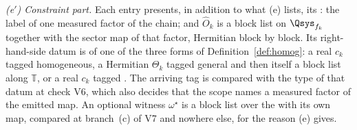 \begin{definition}
\emph{(e$'$) Constraint part.} Each entry presents, in addition to what (e)
lists, its : the label of one measured factor of the chain; and
$\hat O_k$ is a block list on $\Qsys_{f_k}$ together with the sector map of
that factor, Hermitian block by block. Its right-hand-side datum is of one of
the three forms of Definition~\ref{def:homog}: a real $c_k$ tagged
homogeneous, a Hermitian $\Theta_k$ tagged general and then itself a block
list along $\mathbb{T}$, or a real $c_k$ tagged . The
arriving tag is compared with the type of that datum at check V6, which also
decides that the scope names a measured factor of the emitted map. An optional
witness $\omega^{\star}$ is a block list over the  with
its own map, compared at branch~(c) of V7 and nowhere else, for the reason
(e) gives.
\end{definition}
